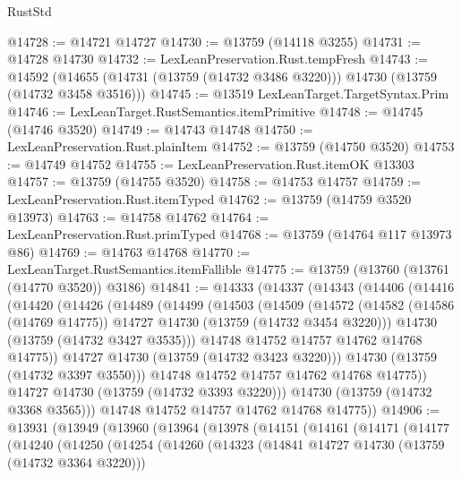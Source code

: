 \begin{lexlean}{RustStd}
\begin{coremodule}
@14728 := @14721 @14727
@14730 := @13759 (@14118 @3255)
@14731 := @14728 @14730
@14732 := LexLeanPreservation.Rust.tempFresh
@14743 := @14592
    (@14655 (@14731 (@13759 (@14732 @3486 @3220))) @14730 (@13759 (@14732 @3458 @3516)))
@14745 := @13519 LexLeanTarget.TargetSyntax.Prim
@14746 := LexLeanTarget.RustSemantics.itemPrimitive
@14748 := @14745 (@14746 @3520)
@14749 := @14743 @14748
@14750 := LexLeanPreservation.Rust.plainItem
@14752 := @13759 (@14750 @3520)
@14753 := @14749 @14752
@14755 := LexLeanPreservation.Rust.itemOK @13303
@14757 := @13759 (@14755 @3520)
@14758 := @14753 @14757
@14759 := LexLeanPreservation.Rust.itemTyped
@14762 := @13759 (@14759 @3520 @13973)
@14763 := @14758 @14762
@14764 := LexLeanPreservation.Rust.primTyped
@14768 := @13759 (@14764 @117 @13973 @86)
@14769 := @14763 @14768
@14770 := LexLeanTarget.RustSemantics.itemFallible
@14775 := @13759 (@13760 (@13761 (@14770 @3520)) @3186)
@14841 := @14333
    (@14337
      (@14343
        (@14406
          (@14416
            (@14420
              (@14426
                (@14489
                  (@14499
                    (@14503
                      (@14509
                        (@14572
                          (@14582
                            (@14586 (@14769 @14775))
                            @14727
                            @14730
                            (@13759 (@14732 @3454 @3220)))
                          @14730
                          (@13759 (@14732 @3427 @3535)))
                        @14748
                        @14752
                        @14757
                        @14762
                        @14768
                        @14775))
                    @14727
                    @14730
                    (@13759 (@14732 @3423 @3220)))
                  @14730
                  (@13759 (@14732 @3397 @3550)))
                @14748
                @14752
                @14757
                @14762
                @14768
                @14775))
            @14727
            @14730
            (@13759 (@14732 @3393 @3220)))
          @14730
          (@13759 (@14732 @3368 @3565)))
        @14748
        @14752
        @14757
        @14762
        @14768
        @14775))
@14906 := @13931
    (@13949
      (@13960
        (@13964
          (@13978
            (@14151
              (@14161
                (@14171
                  (@14177
                    (@14240
                      (@14250
                        (@14254
                          (@14260
                            (@14323
                              (@14841 @14727 @14730 (@13759 (@14732 @3364 @3220)))

\end{coremodule}
\end{lexlean}
